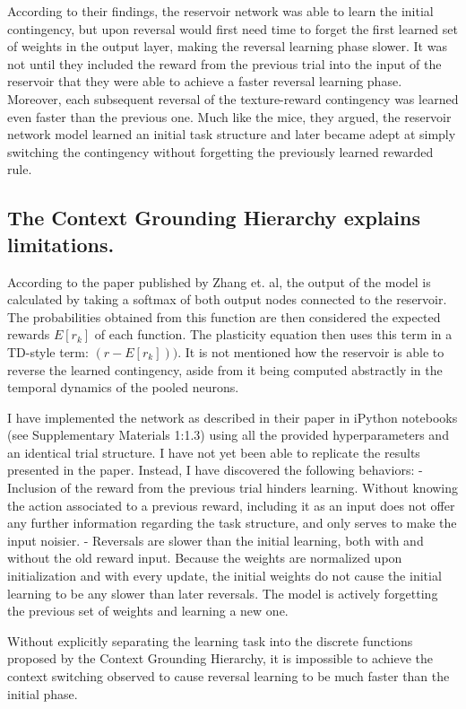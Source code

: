 \documentclass[11pt]{article}
\begin{document}
According to their findings, the reservoir network was able to learn the initial contingency, but upon reversal would first need time to forget the first learned set of weights in the output layer, making the reversal learning phase slower.  It was not until they included the reward from the previous trial into the input of the reservoir that they were able to achieve a faster reversal learning phase.  Moreover, each subsequent reversal of the texture-reward contingency was learned even faster than the previous one.  Much like the mice, they argued, the reservoir network model learned an initial task structure and later became adept at simply switching the contingency without forgetting the previously learned rewarded rule.

\subsection{The Context Grounding Hierarchy explains limitations.}
According to the paper published by Zhang et. al, the output of the model is calculated by taking a softmax of both output nodes connected to the reservoir.  The probabilities obtained from this function are then considered the expected rewards $E[r_k]$ of each function.  The plasticity equation  then uses this term in a TD-style term: $(r - E[r_k]))$.  It is not mentioned how the reservoir is able to reverse the learned contingency, aside from it being computed abstractly in the temporal dynamics of the pooled neurons.

I have implemented the network as described in their paper in iPython notebooks (see Supplementary Materials 1:1.3) using all the provided hyperparameters and an identical trial structure.  I have not yet been able to replicate the results presented in the paper.  Instead, I have discovered the following behaviors:
- Inclusion of the reward from the previous trial hinders learning.  Without knowing the action associated to a previous reward, including it as an input does not offer any further information regarding the task structure, and only serves to make the input noisier.
- Reversals are slower than the initial learning, both with and without the old reward input.  Because the weights are normalized upon initialization and with every update, the initial weights do not cause the initial learning to be any slower than later reversals.  The model is actively forgetting the previous set of weights and learning a new one.

Without explicitly separating the learning task into the discrete functions proposed by the Context Grounding Hierarchy, it is impossible to achieve the context switching observed to cause reversal learning to be much faster than the initial phase.
\end{document}

